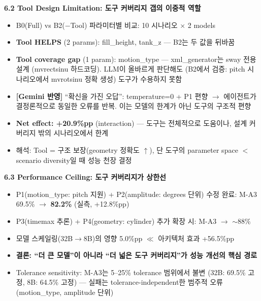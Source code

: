 \documentclass[11pt,a4paper]{article}
\begin{document}
\textbf{6.2 Tool Design Limitation: 도구 커버리지 갭의 이중적 역할}
\begin{itemize}[nosep,leftmargin=1.5em]
\item B0(Full) vs B2($-$Tool) 파라미터별 비교: 10 시나리오 $\times$ 2 models
\item \textbf{Tool HELPS} (2 params): fill\_height, tank\_z --- B2는 두 값을 뒤바꿈
\item \textbf{Tool coverage gap} (1 param): motion\_type --- xml\_generator는 sway 전용 설계 (mvrectsinu 하드코딩). LLM이 올바르게 판단해도 (B2에서 검증: pitch 시나리오에서 mvrotsinu 정확 생성) 도구가 수용하지 못함
\item {\color{red}\textbf{[Gemini 반영]}} ``확신을 가진 오답'': temperature=0 + P1 편향 $\rightarrow$ 에이전트가 결정론적으로 동일한 오류를 반복. 이는 모델의 한계가 아닌 도구의 구조적 편향
\item \textbf{Net effect: +20.9\%pp} (interaction) --- 도구는 전체적으로 도움이나, 설계 커버리지 밖의 시나리오에서 한계
\item 해석: Tool = 구조 보장(geometry 정확도 $\uparrow$), 단 도구의 parameter space $<$ scenario diversity일 때 성능 천장 결정
\end{itemize}

\textbf{6.3 Performance Ceiling: 도구 커버리지가 상한선}
\begin{itemize}[nosep,leftmargin=1.5em]
\item P1(motion\_type: pitch 지원) + P2(amplitude: degrees 단위) 수정 완료: M-A3 69.5\% $\rightarrow$ \textbf{82.2\%} (실측, +12.8\%pp)
\item P3(timemax 추론) + P4(geometry: cylinder) 추가 확장 시: M-A3 $\rightarrow$ $\sim$88\%
\item 모델 스케일링(32B$\rightarrow$8B)의 영향 5.0\%pp $\ll$ 아키텍처 효과 +56.5\%pp
\item \textbf{결론: ``더 큰 모델''이 아니라 ``더 넓은 도구 커버리지''가 성능 개선의 핵심 경로}
\item Tolerance sensitivity: M-A3는 5--25\% tolerance 범위에서 불변 (32B: 69.5\% 고정, 8B: 64.5\% 고정) --- 실패는 tolerance-independent한 범주적 오류 (motion\_type, amplitude 단위)
\end{itemize}
\end{document}
